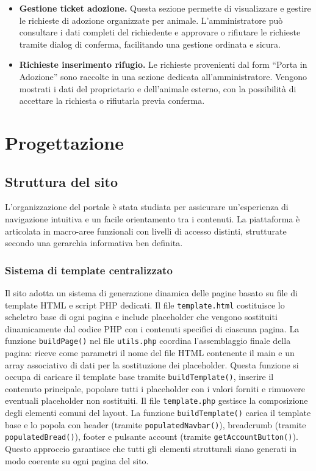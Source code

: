 \documentclass[a4paper,10pt]{article}
\begin{document}
\begin{itemize}
    \item \textbf{Gestione ticket adozione.}  
    Questa sezione permette di visualizzare e gestire le richieste di adozione organizzate per animale. L’amministratore può consultare i dati completi del richiedente e approvare o rifiutare le richieste tramite dialog di conferma, facilitando una gestione ordinata e sicura.

    \item \textbf{Richieste inserimento rifugio.}  
    Le richieste provenienti dal form ``Porta in Adozione'' sono raccolte in una sezione dedicata all’amministratore. Vengono mostrati i dati del proprietario e dell’animale esterno, con la possibilità di accettare la richiesta o rifiutarla previa conferma.
	\end{itemize}
	\section{Progettazione}
    \subsection{Struttura del sito}
    L’organizzazione del portale è stata studiata per assicurare un’esperienza di navigazione intuitiva e un facile orientamento tra i contenuti. La piattaforma è articolata in macro-aree funzionali con livelli di accesso distinti, strutturate secondo una gerarchia informativa ben definita.

    \subsubsection{Sistema di template centralizzato}
    Il sito adotta un sistema di generazione dinamica delle pagine basato su file di template HTML e script PHP dedicati. Il file \texttt{template.html} costituisce lo scheletro base di ogni pagina e include placeholder che vengono sostituiti dinamicamente dal codice PHP con i contenuti specifici di ciascuna pagina.
    La funzione \texttt{buildPage()} nel file \texttt{utils.php} coordina l'assemblaggio finale della pagina: riceve come parametri il nome del file HTML contenente il main e un array associativo di dati per la sostituzione dei placeholder. Questa funzione si occupa di caricare il template base tramite \texttt{buildTemplate()}, inserire il contenuto principale, popolare tutti i placeholder con i valori forniti e rimuovere eventuali placeholder non sostituiti.
    Il file \texttt{template.php} gestisce la composizione degli elementi comuni del layout. La funzione \texttt{buildTemplate()} carica il template base e lo popola con header (tramite \texttt{populatedNavbar()}), breadcrumb (tramite \texttt{populatedBread()}), footer e pulsante account (tramite \texttt{getAccountButton()}). Questo approccio garantisce che tutti gli elementi strutturali siano generati in modo coerente su ogni pagina del sito.
\end{document}
